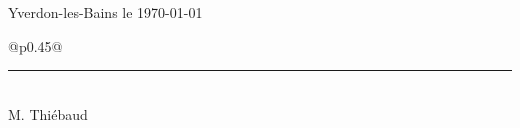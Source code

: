 \documentclass[a4paper,12pt,oneside]{article}
\begin{document}
    Yverdon-les-Bains le \today \\

	\vspace{1cm}
	\noindent\hfill
	\begin{tabular}{@{}p{0.45\textwidth}@{}}
	  \rule{\linewidth}{0.4pt} \\
	   M. Thiébaud
	\end{tabular}
  

	
\end{document}
